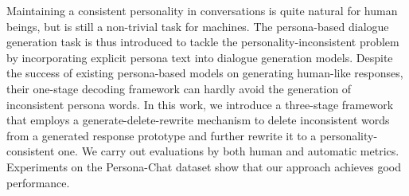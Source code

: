 Maintaining a consistent personality in conversations is quite natural for human beings, but is still a non-trivial task for machines. The persona-based dialogue generation task is thus introduced to tackle the personality-inconsistent problem by incorporating explicit persona text into dialogue generation models. Despite the success of existing persona-based models on generating human-like responses, their one-stage decoding framework can hardly avoid the generation of inconsistent persona words. In this work, we introduce a three-stage framework that employs a generate-delete-rewrite mechanism to delete inconsistent words from a generated response prototype and further rewrite it to a personality-consistent one. We carry out evaluations by both human and automatic metrics. Experiments on the Persona-Chat dataset show that our approach achieves good performance.
